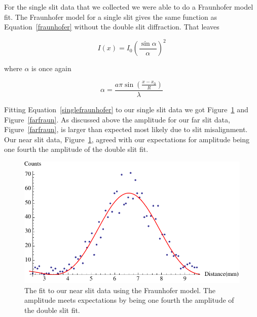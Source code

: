\documentclass[prb,preprint]{revtex4-1}
\begin{document}
For the single slit data that we collected we were able to do a Fraunhofer model fit. The Fraunhofer model for a single slit gives the same function as Equation~\ref{fraunhofer} without the double slit diffraction. That leaves

\begin{equation}
\label{singlefraunhofer}
I(x) = I_0 \left(\frac{\sin\alpha}{\alpha}\right)^2
\end{equation}
 
 where $\alpha$ is once again

\begin{equation}
\label{alpha}
\alpha = \frac{a \pi \sin(\frac{x - x_0}{R})}{\lambda}
\end{equation}

Fitting Equation~\ref{singlefraunhofer} to our single slit data we got Figure~\ref{nearfraun} and Figure~\ref{farfraun}. As discussed above the amplitude for our far slit data, Figure~\ref{farfraun}, is larger than expected most likely due to slit misalignment. Our near slit data, Figure~\ref{nearfraun}, agreed with our expectations for amplitude being one fourth the amplitude of the double slit fit.

\begin{figure}[h!]
\centering
\includegraphics[width=6in]{nearfraun.pdf}
\caption{The fit to our near slit data using the Fraunhofer model. The amplitude meets expectations by being one fourth the amplitude of the double slit fit.}
\label{nearfraun}
\end{figure}
\end{document}
